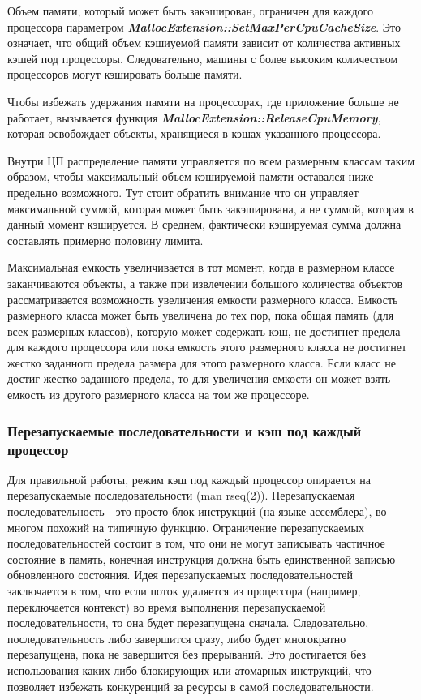 Объем памяти, который может быть закэширован, ограничен для каждого процессора параметром \textbf{\textit{MallocExtension::SetMaxPerCpuCacheSize}}. Это означает, что общий объем кэшиуемой памяти зависит от количества активных кэшей под процессоры. Следовательно, машины с более высоким количеством процессоров могут кэшировать больше памяти.

Чтобы избежать удержания памяти на процессорах, где приложение больше не работает, вызывается функция \textbf{\textit{MallocExtension::ReleaseCpuMemory}}, которая освобождает объекты, хранящиеся в кэшах указанного процессора.

Внутри ЦП распределение памяти управляется по всем размерным классам таким образом, чтобы максимальный объем кэшируемой памяти оставался ниже предельно возможного. Тут стоит обратить внимание что он управляет максимальной суммой, которая может быть закэширована, а не суммой, которая в данный момент кэшируется. В среднем, фактически кэшируемая сумма должна составлять примерно половину лимита.

Максимальная емкость увеличивается в тот момент, когда в размерном классе заканчиваются объекты, а также при извлечении большого количества объектов рассматривается возможность увеличения емкости размерного класса. Емкость размерного класса может быть увеличена до тех пор, пока общая память (для всех размерных классов), которую может содержать кэш, не достигнет предела для каждого процессора или пока емкость этого размерного класса не достигнет жестко заданного предела размера для этого размерного класса. Если класс не достиг жестко заданного предела, то для увеличения емкости он может взять емкость из другого размерного класса на том же процессоре.

\subsubsection{Перезапускаемые последовательности и кэш под каждый процессор}

Для правильной работы, режим кэш под каждый процессор опирается на перезапускаемые последовательности (man rseq(2)). Перезапускаемая последовательность - это просто блок инструкций (на языке ассемблера), во многом похожий на типичную функцию. Ограничение перезапускаемых последовательностей состоит в том, что они не могут записывать частичное состояние в память, конечная инструкция должна быть единственной записью обновленного состояния. Идея перезапускаемых последовательностей заключается в том, что если поток удаляется из процессора (например, переключается контекст) во время выполнения перезапускаемой последовательности, то она будет перезапущена сначала. Следовательно, последовательность либо завершится сразу, либо будет многократно перезапущена, пока не завершится без прерываний. Это достигается без использования каких-либо блокирующих или атомарных инструкций, что позволяет избежать конкуренций за ресурсы в самой последовательности.

